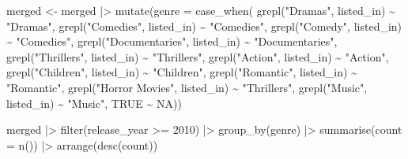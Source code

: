 \documentclass[
]{article}
\newenvironment{Shaded}{\begin{snugshade}}{\end{snugshade}}
\newcommand{\AttributeTok}[1]{\textcolor[rgb]{0.77,0.63,0.00}{#1}}
\newcommand{\ConstantTok}[1]{\textcolor[rgb]{0.00,0.00,0.00}{#1}}
\newcommand{\DecValTok}[1]{\textcolor[rgb]{0.00,0.00,0.81}{#1}}
\newcommand{\FunctionTok}[1]{\textcolor[rgb]{0.00,0.00,0.00}{#1}}
\newcommand{\NormalTok}[1]{#1}
\newcommand{\OtherTok}[1]{\textcolor[rgb]{0.56,0.35,0.01}{#1}}
\newcommand{\SpecialCharTok}[1]{\textcolor[rgb]{0.00,0.00,0.00}{#1}}
\newcommand{\StringTok}[1]{\textcolor[rgb]{0.31,0.60,0.02}{#1}}
\begin{document}
\begin{Shaded}
\begin{Highlighting}[]
\NormalTok{merged }\OtherTok{\textless{}{-}}\NormalTok{ merged }\SpecialCharTok{|\textgreater{}}
  \FunctionTok{mutate}\NormalTok{(}\AttributeTok{genre =} \FunctionTok{case\_when}\NormalTok{(}
    \FunctionTok{grepl}\NormalTok{(}\StringTok{"Dramas"}\NormalTok{, listed\_in) }\SpecialCharTok{\textasciitilde{}} \StringTok{"Dramas"}\NormalTok{,}
    \FunctionTok{grepl}\NormalTok{(}\StringTok{"Comedies"}\NormalTok{, listed\_in) }\SpecialCharTok{\textasciitilde{}} \StringTok{"Comedies"}\NormalTok{,}
    \FunctionTok{grepl}\NormalTok{(}\StringTok{"Comedy"}\NormalTok{, listed\_in) }\SpecialCharTok{\textasciitilde{}} \StringTok{"Comedies"}\NormalTok{,}
    \FunctionTok{grepl}\NormalTok{(}\StringTok{"Documentaries"}\NormalTok{, listed\_in) }\SpecialCharTok{\textasciitilde{}} \StringTok{"Documentaries"}\NormalTok{,}
    \FunctionTok{grepl}\NormalTok{(}\StringTok{"Thrillers"}\NormalTok{, listed\_in) }\SpecialCharTok{\textasciitilde{}} \StringTok{"Thrillers"}\NormalTok{,}
    \FunctionTok{grepl}\NormalTok{(}\StringTok{"Action"}\NormalTok{, listed\_in) }\SpecialCharTok{\textasciitilde{}} \StringTok{"Action"}\NormalTok{,}
    \FunctionTok{grepl}\NormalTok{(}\StringTok{"Children"}\NormalTok{, listed\_in) }\SpecialCharTok{\textasciitilde{}} \StringTok{"Children"}\NormalTok{,}
    \FunctionTok{grepl}\NormalTok{(}\StringTok{"Romantic"}\NormalTok{, listed\_in) }\SpecialCharTok{\textasciitilde{}} \StringTok{"Romantic"}\NormalTok{,}
    \FunctionTok{grepl}\NormalTok{(}\StringTok{"Horror Movies"}\NormalTok{, listed\_in) }\SpecialCharTok{\textasciitilde{}} \StringTok{"Thrillers"}\NormalTok{,}
    \FunctionTok{grepl}\NormalTok{(}\StringTok{"Music"}\NormalTok{, listed\_in) }\SpecialCharTok{\textasciitilde{}} \StringTok{"Music"}\NormalTok{,}
    \ConstantTok{TRUE} \SpecialCharTok{\textasciitilde{}} \ConstantTok{NA}\NormalTok{))}

\NormalTok{merged }\SpecialCharTok{|\textgreater{}}
  \FunctionTok{filter}\NormalTok{(release\_year }\SpecialCharTok{\textgreater{}=} \DecValTok{2010}\NormalTok{) }\SpecialCharTok{|\textgreater{}}
  \FunctionTok{group\_by}\NormalTok{(genre) }\SpecialCharTok{|\textgreater{}}
  \FunctionTok{summarise}\NormalTok{(}\AttributeTok{count =} \FunctionTok{n}\NormalTok{()) }\SpecialCharTok{|\textgreater{}}
  \FunctionTok{arrange}\NormalTok{(}\FunctionTok{desc}\NormalTok{(count))}
\end{Highlighting}
\end{Shaded}
\end{document}
